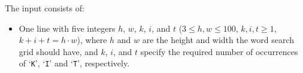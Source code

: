 
The input consists of:
\begin{itemize}
\item One line with five integers $h$, $w$, $k$, $i$, and $t$ ($3 \le h,w \le 100$, $k,i,t \ge 1$, $k+i+t = h\cdot w$), where $h$ and $w$ are the height and width the word search grid should have, and $k$, $i$, and $t$ specify the required number of occurrences of `\texttt{K}', `\texttt{I}' and `\texttt{T}', respectively.
\end{itemize}
